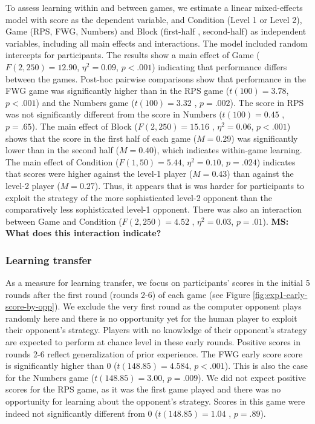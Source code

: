 \documentclass[
  english,
  man,floatsintext]{apa6}
\begin{document}
To assess learning within and between games, we estimate a linear mixed-effects model with score as the dependent variable, and Condition (Level 1 or Level 2), Game (RPS, FWG, Numbers) and Block (first-half , second-half) as independent variables, including all main effects and interactions. The model included random intercepts for participants. The results show a main effect of Game (\(F(2,250) = 12.90\), \(\eta^{2} = 0.09\), \(p < .001\)) indicating that performance differs between the games. Post-hoc pairwise comparisons show that performance in the FWG game was significantly higher than in the RPS game (\(t(100) =3.78\), \(p < .001\)) and the Numbers game (\(t(100) = 3.32\) , \(p = .002\)). The score in RPS was not significantly different from the score in Numbers (\(t(100) = 0.45\) , \(p = .65\)). The main effect of Block (\(F(2,250) = 15.16\) , \(\eta^{2} = 0.06\), \(p < .001\)) shows that the score in the first half of each game (\(M = 0.29\)) was significantly lower than in the second half (\(M = 0.40\)), which indicates within-game learning. The main effect of Condition (\(F(1,50) = 5.44\), \(\eta^{2} = 0.10\), \(p = .024\)) indicates that scores were higher against the level-1 player (\(M = 0.43\)) than against the level-2 player (\(M = 0.27\)). Thus, it appears that is was harder for participants to exploit the strategy of the more sophisticated level-2 opponent than the comparatively less sophisticated level-1 opponent. There was also an interaction between Game and Condition (\(F(2,250) = 4.52\) , \(\eta^{2} = 0.03\), \(p = .01\)). \textbf{MS: What does this interaction indicate?}

\hypertarget{learning-transfer}{%
\subsubsection{Learning transfer}\label{learning-transfer}}

As a measure for learning transfer, we focus on participants' scores in the initial 5 rounds after the first round (rounds 2-6) of each game (see Figure \ref{fig:exp1-early-score-by-opp}). We exclude the very first round as the computer opponent plays randomly here and there is no opportunity yet for the human player to exploit their opponent's strategy. Players with no knowledge of their opponent's strategy are expected to perform at chance level in these early rounds. Positive scores in rounds 2-6 reflect generalization of prior experience. The FWG early score score is significantly higher than 0 (\(t(148.85) = 4.584\), \(p < .001\)). This is also the case for the Numbers game (\(t(148.85) = 3.00\), \(p = .009\)). We did not expect positive scores for the RPS game, as it was the first game played and there was no opportunity for learning about the opponent's strategy. Scores in this game were indeed not significantly different from 0 (\(t(148.85) = 1.04\) , \(p = .89\)).
\end{document}
